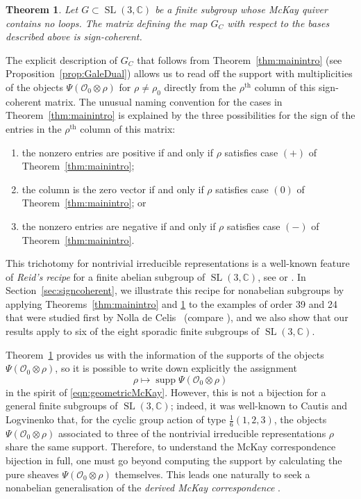 \documentclass[11pt,reqno]{amsart}
\numberwithin{equation}{section}
\newtheorem{theorem}{Theorem}[section]
\theoremstyle{definition}
\newcommand{\CC}{\ensuremath{\mathbb{C}}}
\newcommand{\0}{\operatorname{0}}
\newcommand{\SL}{\operatorname{SL}}
\newcommand{\supp}{\operatorname{supp}}
\begin{document}
 \begin{theorem}
 \label{thm:signcoherentintro}
 Let $G\subset \SL(3,\CC)$ be a finite subgroup whose McKay quiver contains no loops. The matrix defining the map $G_C$ with respect to the bases described above is sign-coherent. 
  \end{theorem}

 The explicit description of $G_C$ that follows from Theorem~\ref{thm:mainintro} (see Proposition~\ref{prop:GaleDual}) allows us to read off the support with multiplicities of the objects $\Psi(\mathcal{O}_0\otimes \rho)$ for $\rho\neq \rho_0$ directly from the $\rho^{\text{th}}$ column of this sign-coherent matrix. The unusual naming convention for the cases in Theorem~\ref{thm:mainintro} is explained by the three possibilities for the sign of the entries in the $\rho^{\text{th}}$ column of this matrix: 
 \begin{enumerate}
     \item[\ensuremath{(+)}] the nonzero entries are positive if and only if $\rho$ satisfies case \ensuremath{(+)} of Theorem~\ref{thm:mainintro};
     \item[(0)] the column is the zero vector if and only if $\rho$ satisfies case \ensuremath{(0)} of Theorem~\ref{thm:mainintro}; or
     \item[($-$)] the nonzero entries are negative if and only if $\rho$ satisfies case \ensuremath{(-)} of Theorem~\ref{thm:mainintro}.
 \end{enumerate}
This trichotomy for nontrivial irreducible representations is a well-known feature of \emph{Reid's recipe} for a finite abelian subgroup of $\SL(3,\CC)$, see \cite[Theorem~1.2]{Logvinenko10} or \cite[Theorem~1.4]{BCQ15}. In Section~\ref{sec:signcoherent}, we illustrate this recipe for nonabelian subgroups  by applying Theorems~\ref{thm:mainintro} and \ref{thm:signcoherentintro} to the examples of order 39 and 24  that were studied first by Nolla de Celis~\cite{NolladeCelis21} (compare \cite[Example~6.5]{C21}), and we also show that our results apply to six of the eight sporadic finite subgroups of $\SL(3,\CC)$.


 \medskip
 
 
 Theorem~\ref{thm:signcoherentintro} provides us with the information of the supports of the objects $\Psi(\mathcal{O}_0\otimes \rho)$, so it is possible to write down explicitly the assignment 
 \[
\rho \longmapsto \supp\Psi(\mathcal{O}_{0}\otimes \rho)
  \]
 in the spirit of \eqref{eqn:geometricMcKay}. However, this is not a bijection for a general finite subgroups of $\SL(3,\CC)$; indeed, it was well-known to Cautis and Logvinenko that, for the cyclic group action of type $\frac{1}{6}(1,2,3)$,  the objects $\Psi(\mathcal{O}_0\otimes \rho)$ associated to three of the nontrivial irreducible representations $\rho$ share the same support. Therefore, to understand the McKay correspondence bijection in full, one must go beyond computing the support by calculating the pure sheaves $\Psi(
 \mathcal{O}_0\otimes \rho)$ themselves. This leads one naturally to seek a nonabelian generalisation of the \emph{derived McKay correspondence} \cite{CCL17}.
\end{document}
